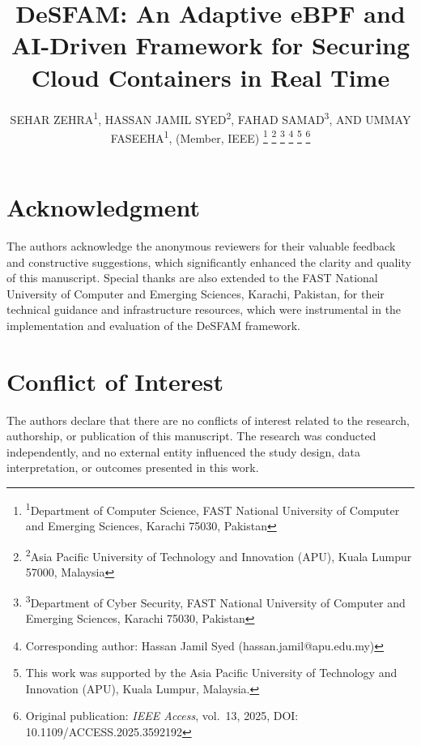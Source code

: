 \documentclass[journal,10pt,twoside]{IEEEtran}
\begin{document}
\title{DeSFAM: An Adaptive eBPF and AI-Driven Framework for Securing Cloud Containers in Real Time}

\author{SEHAR ZEHRA\textsuperscript{1},
HASSAN JAMIL SYED\textsuperscript{2},
FAHAD SAMAD\textsuperscript{3},
AND UMMAY FASEEHA\textsuperscript{1}, (Member, IEEE)
\thanks{\textsuperscript{1}Department of Computer Science, FAST National University of Computer and Emerging Sciences, Karachi 75030, Pakistan}
\thanks{\textsuperscript{2}Asia Pacific University of Technology and Innovation (APU), Kuala Lumpur 57000, Malaysia}
\thanks{\textsuperscript{3}Department of Cyber Security, FAST National University of Computer and Emerging Sciences, Karachi 75030, Pakistan}
\thanks{Corresponding author: Hassan Jamil Syed (hassan.jamil@apu.edu.my)}
\thanks{This work was supported by the Asia Pacific University of Technology and Innovation (APU), Kuala Lumpur, Malaysia.}
\thanks{Original publication: \textit{IEEE Access}, vol.~13, 2025, DOI: 10.1109/ACCESS.2025.3592192}
}

\maketitle









\clearpage


\section*{Acknowledgment}
The authors acknowledge the anonymous reviewers for their valuable feedback and constructive
suggestions, which significantly enhanced the clarity and quality of this manuscript. Special
thanks are also extended to the FAST National University of Computer and Emerging Sciences,
Karachi, Pakistan, for their technical guidance and infrastructure resources, which were
instrumental in the implementation and evaluation of the DeSFAM framework.

\section*{Conflict of Interest}
The authors declare that there are no conflicts of interest related to the research, authorship,
or publication of this manuscript. The research was conducted independently, and no external
entity influenced the study design, data interpretation, or outcomes presented in this work.



\end{document}
